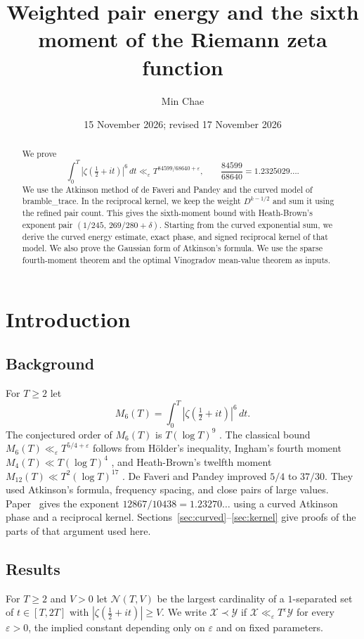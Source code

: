 \documentclass[11pt]{amsart}
\title[Weighted pair energy and the sixth moment]{Weighted pair energy and the sixth moment of the Riemann zeta function}
\author{Min Chae}
\date{15 November 2026; revised 17 November 2026}
\theoremstyle{definition}
\theoremstyle{remark}
\numberwithin{equation}{section}
\newcommand{\cN}{\mathcal{N}}
\begin{document}
\raggedbottom
\setlength{\emergencystretch}{2em}
\renewcommand{\arraystretch}{1.35}

\begin{abstract}
We prove
\[
\int_0^T|\zeta(\tfrac12+it)|^6\,dt\ll_\varepsilon T^{84599/68640+\varepsilon},
\qquad \frac{84599}{68640}=1.2325029\ldots .
\]
We use the Atkinson method of de Faveri and Pandey and the curved
model of bramble\_trace. In the reciprocal kernel, we keep the weight
$D^{k-1/2}$ and sum it using the refined pair count. This gives the
sixth-moment bound with Heath-Brown's exponent pair
$(1/245,\,269/280+\delta)$.
Starting from the curved exponential sum, we derive the curved energy
estimate, exact phase, and signed reciprocal kernel of that model.
We also prove the Gaussian form of Atkinson's formula.
We use the sparse fourth-moment theorem and the optimal Vinogradov
mean-value theorem as inputs.
\end{abstract}

\maketitle

\section{Introduction}

\subsection{Background}
For $T\ge2$ let
\[
M_6(T)=\int_0^T|\zeta(\tfrac12+it)|^6\,dt .
\]
The conjectured order of $M_6(T)$ is $T(\log T)^9$ \cite{CG98}.
The classical bound $M_6(T)\ll_\varepsilon T^{5/4+\varepsilon}$ follows
from H\"older's inequality, Ingham's fourth moment
$M_4(T)\ll T(\log T)^4$ \cite{Ing26}, and Heath-Brown's twelfth moment
$M_{12}(T)\ll T^2(\log T)^{17}$ \cite{HB78}.
De Faveri and Pandey \cite{dFP} improved $5/4$ to $37/30$.
They used Atkinson's formula, frequency spacing, and close pairs of
large values. Paper~\cite{B38} gives the exponent
$12867/10438=1.23270\ldots$ using a curved Atkinson phase and a
reciprocal kernel. Sections~\ref{sec:curved}--\ref{sec:kernel}
give proofs of the parts of that argument used here.

\subsection{Results}
For $T\ge2$ and $V>0$ let $\cN(T,V)$ be the largest cardinality of a $1$-separated set of $t\in[T,2T]$ with $|\zeta(\frac12+it)|\ge V$. We write $\mathcal X\prec\mathcal Y$ if $\mathcal X\ll_\varepsilon T^{\varepsilon}\mathcal Y$ for every $\varepsilon>0$, the implied constant depending only on $\varepsilon$ and on fixed parameters.
\end{document}
